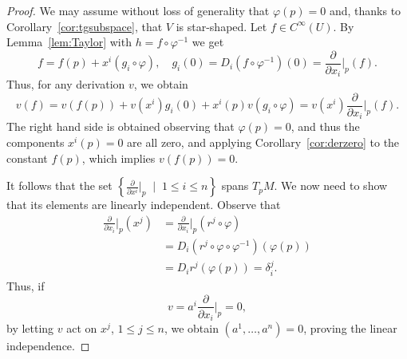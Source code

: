 \begin{proof}
	We may assume without loss of generality that $\varphi(p) = 0$ and, thanks to Corollary~\ref{cor:tgsubspace}, that $V$ is star-shaped.
	Let $f\in C^\infty(U)$.
	By Lemma~\ref{lem:Taylor} with $h = f \circ \varphi^{-1}$ we get
	\begin{equation}
		f = f(p) + x^i (g_i \circ \varphi),
		\quad g_i(0) = D_i (f \circ \varphi^{-1})(0) = \frac{\partial}{\partial x_i}\Big|_p(f).
	\end{equation}
	Thus, for any derivation $v$, we obtain
	\begin{equation}
		v(f) = v(f(p)) + v(x^i)g_i(0) + x^i(p) v(g_i\circ\varphi) = v(x^i)  \frac{\partial}{\partial x_i}\Big|_p(f).
	\end{equation}
	The right hand side is obtained observing that $\varphi(p) = 0$, and thus the components $x^i(p) = 0$ are all zero, and applying Corollary~\ref{cor:derzero} to the constant $f(p)$, which implies $v(f(p)) = 0$.

	It follows that the set $\left\{\frac{\partial}{\partial x^i}\Big|_p\;\mid\; 1\leq i\leq n\right\}$ spans $T_p M$.
	We now need to show that its elements are linearly independent.
	Observe that
	\begin{align}
		\frac{\partial}{\partial x_i}\Big|_p (x^j) & =
		\frac{\partial}{\partial x_i}\Big|_p (r^j \circ \varphi)                                               \\
		                                           & = D_i (r^j \circ \varphi \circ \varphi^{-1}) (\varphi(p)) \\
		                                           & = D_i r^j(\varphi(p)) = \delta^j_i.
	\end{align}
	Thus, if
	\begin{equation}
		v = a^i \frac{\partial}{\partial x_i}\Big|_p = 0,
	\end{equation}
	by letting $v$ act on $x^j$, $1\leq j\leq n$, we obtain $(a^1, \ldots, a^n) = 0$, proving the linear independence.
\end{proof}

